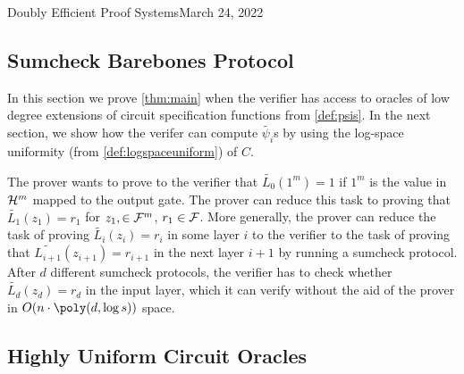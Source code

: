 \begin{lecture}{9}{Doubly Efficient Proof Systems}{March 24, 2022}
\subsection{Sumcheck Barebones Protocol}

In this section we prove \cref{thm:main} when the verifier has access to oracles of low degree extensions of circuit specification functions from \cref{def:psis}. In the next section, we show how the verifer can compute $\tilde{\psi_i}$s by using the log-space uniformity (from \cref{def:logspaceuniform}) of $C$. 

The prover wants to prove to the verifier that $\tilde{L_0}(1^m) = 1$ if $1^m$ is the value in $\mathcal{H}^m$ mapped to the output gate. The prover can reduce this task to proving that $\tilde{L_1}(z_1) = r_1$ for $z_1, \in \mathcal{F}^m$, $r_1 \in \mathcal{F}$. More generally, the prover can reduce the task of proving $\tilde{L_i}(z_i) = r_i$ in some layer $i$ to the verifier to the task of proving that $\tilde{L_{i+1}}(z_{i+1}) = r_{i+1}$ in the next layer $i+1$ by running a sumcheck protocol. After $d$ different sumcheck protocols, the verifier has to check whether $\tilde{L_d}(z_d) = r_d$ in the input layer, which it can verify without the aid of the prover in $O(n\cdot \poly(d, \log s))$ space.  


\subsection{Highly Uniform Circuit Oracles}

%
%
\end{lecture}

